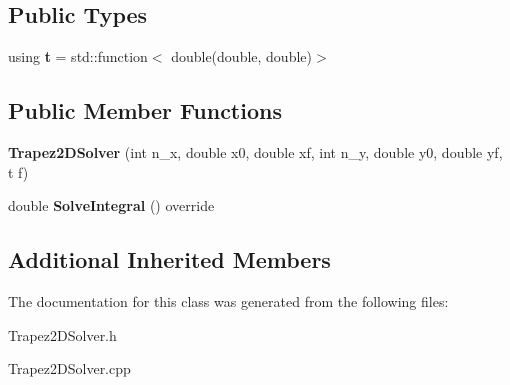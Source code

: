 \subsection*{Public Types}
\begin{DoxyCompactItemize}
\item 
\mbox{\label{class_trapez2_d_solver_a2af165a7995664482df24eec24a39ec3}} 
using {\bfseries t} = std\+::function$<$ double(double, double)$>$
\end{DoxyCompactItemize}
\subsection*{Public Member Functions}
\begin{DoxyCompactItemize}
\item 
\mbox{\label{class_trapez2_d_solver_a95b57f9279e40991610b4e91747d7e0d}} 
{\bfseries Trapez2\+D\+Solver} (int n\+\_\+x, double x0, double xf, int n\+\_\+y, double y0, double yf, t f)
\item 
\mbox{\label{class_trapez2_d_solver_a88f724ff6fd2c566d54f5d0ccc500cb9}} 
double {\bfseries Solve\+Integral} () override
\end{DoxyCompactItemize}
\subsection*{Additional Inherited Members}


The documentation for this class was generated from the following files\+:\begin{DoxyCompactItemize}
\item 
Trapez2\+D\+Solver.\+h\item 
Trapez2\+D\+Solver.\+cpp\end{DoxyCompactItemize}
